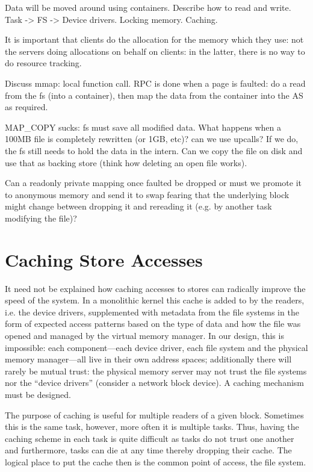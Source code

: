 Data will be moved around using containers.  Describe how to read and
write.  Task -> FS -> Device drivers.  Locking memory.  Caching.

It is important that clients do the allocation for the memory which
they use: not the servers doing allocations on behalf on clients: in
the latter, there is no way to do resource tracking.

Discuss mmap: local function call.  RPC is done when a page is
faulted: do a read from the fs (into a container), then map the data
from the container into the AS as required.

MAP\_COPY sucks: fs must save all modified data.  What happens when a
100MB file is completely rewritten (or 1GB, etc)?  can we use upcalls?
If we do, the fs still needs to hold the data in the intern.  Can we
copy the file on disk and use that as backing store (think how
deleting an open file works).

Can a readonly private mapping once faulted be dropped or must we
promote it to anonymous memory and send it to swap fearing that the
underlying block might change between dropping it and rereading it
(e.g. by another task modifying the file)?

\section{Caching Store Accesses}

It need not be explained how caching accesses to stores can radically
improve the speed of the system.  In a monolithic kernel this cache is
added to by the readers, i.e. the device drivers, supplemented with
metadata from the file systems in the form of expected access patterns
based on the type of data and how the file was opened and managed by
the virtual memory manager.  In our design, this is impossible: each
component---each device driver, each file system and the physical
memory manager---all live in their own address spaces; additionally
there will rarely be mutual trust: the physical memory server may not
trust the file systems nor the ``device drivers'' (consider a network
block device).  A caching mechanism must be designed.

The purpose of caching is useful for multiple readers of a given
block.  Sometimes this is the same task, however, more often it is
multiple tasks.  Thus, having the caching scheme in each task is quite
difficult as tasks do not trust one another and furthermore, tasks can
die at any time thereby dropping their cache.  The logical place to
put the cache then is the common point of access, the file system.


